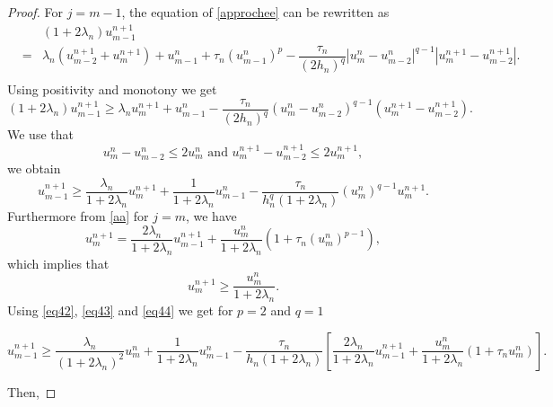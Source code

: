 \documentclass[a4paper,12pt,english,reqno]{smfart}
\begin{document}
	\begin{proof}
		For $j=m-1$, the equation of \eqref{approchee} can be rewritten as
		\begin{eqnarray}
		&& (1+2\lambda_{n})u_{m-1}^{n+1} \label{aa}\\
		&=&\lambda_{n}(u_{m-2}^{n+1}+u_{m}^{n+1})+u_{m-1}^{n}+\tau_{n}(u_{m-1}^{n})^{p}
	     -\dfrac{\tau_{n}}{(2h_{n})^{q}}\left|u_{m}^{n}-u_{m-2}^{n}\right|^{q-1}\left|u_{m}^{n+1}-u_{m-2}^{n+1}\right|.\nonumber \\ \nonumber 	
		\end{eqnarray}
		Using positivity and monotony we get
		\begin{equation*}
		(1+2\lambda_{n})u_{m-1}^{n+1} \geq  \lambda_{n}u_{m}^{n+1}+u_{m-1}^{n}-\dfrac{\tau_{n}}{(2h_{n})^{q}}(u_{m}^{n}-u_{m-2}^{n})^{q-1}(u_{m}^{n+1}-u_{m-2}^{n+1}).
		\end{equation*}
		We use that 
		\begin{equation}
		u_{m}^{n}-u_{m-2}^{n}\leq 2 u_{m}^{n} \text{ and } u_{m}^{n+1}-u_{m-2}^{n+1}\leq 2 u_{m}^{n+1},
		\label{bb}
		\end{equation}
		we obtain
		\begin{equation}
		u_{m-1}^{n+1}\geq \dfrac{\lambda_{n}}{1+2\lambda_{n}}u_{m}^{n+1}+\dfrac{1}{1+2\lambda_{n}}u_{m-1}^{n}-\dfrac{\tau_{n}}{h_{n}^{q}(1+2\lambda_{n})}(u_{m}^{n})^{q-1}u_{m}^{n+1}.
		\label{eq42}
		\end{equation}
		Furthermore from \eqref{aa} for $j=m$, we have
		\begin{equation}
		u_{m}^{n+1}=\dfrac{2\lambda_{n}}{1+2\lambda_{n}}u_{m-1}^{n+1}+\dfrac{u_{m}^{n}}{1+2\lambda_{n}}\left(1+\tau_{n}(u_{m}^{n})^{p-1}\right), 
		\label{eq43}
		\end{equation} 
		which implies that
		\begin{equation}
		u_{m}^{n+1}\geq \dfrac{u_{m}^{n}}{1+2\lambda_{n}}. 
		\label{eq44}
		\end{equation} 
		Using \eqref{eq42}, \eqref{eq43} and \eqref{eq44} we get for $p=2$ and $q=1$
	
			\begin{equation*}
			u_{m-1}^{n+1}\geq  \frac{\lambda_{n}}{(1+2\lambda_{n})^{2}}u_{m}^{n}+\frac{1}{1+2\lambda_{n}}u_{m-1}^{n}
			-\frac{\tau_{n}}{h_{n}(1+2\lambda_{n})}\left[\frac{2\lambda_{n}}{1+2\lambda_{n}}u_{m-1}^{n+1}+\frac{u_{m}^{n}}{1+2\lambda_{n}}(1+\tau_{n}u_{m}^{n})\right].
			\end{equation*}
	
		Then, 
	

\end{proof}
\end{document}
